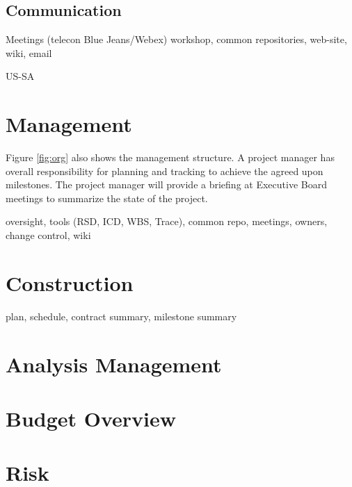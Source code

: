 \documentclass[preprint]{aastex}
\begin{document}
\subsection{Communication}
Meetings (telecon Blue Jeans/Webex)  workshop, common repositories, web-site, wiki, email

US-SA


\section{Management}
Figure \ref{fig:org} also shows the management structure.  A project manager has overall responsibility for planning and tracking to achieve the agreed upon milestones.  The project manager will provide a briefing at Executive Board meetings to summarize the state of the project.

oversight, tools (RSD, ICD, WBS, Trace), common repo, meetings, owners, change control, wiki

\section{Construction}
plan, schedule, contract summary, milestone summary

\section{Analysis Management}

\section{Budget Overview}

\section{Risk}
\end{document}

